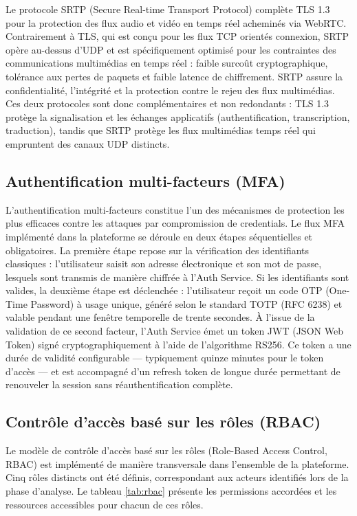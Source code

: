 Le protocole SRTP (Secure Real-time Transport Protocol) complète TLS 1.3 pour la protection des flux audio et vidéo en temps réel acheminés via WebRTC. Contrairement à TLS, qui est conçu pour les flux TCP orientés connexion, SRTP opère au-dessus d'UDP et est spécifiquement optimisé pour les contraintes des communications multimédias en temps réel : faible surcoût cryptographique, tolérance aux pertes de paquets et faible latence de chiffrement. SRTP assure la confidentialité, l'intégrité et la protection contre le rejeu des flux multimédias. Ces deux protocoles sont donc complémentaires et non redondants : TLS 1.3 protège la signalisation et les échanges applicatifs (authentification, transcription, traduction), tandis que SRTP protège les flux multimédias temps réel qui empruntent des canaux UDP distincts.

\subsection{Authentification multi-facteurs (MFA)}
L'authentification multi-facteurs constitue l'un des mécanismes de protection les plus efficaces contre les attaques par compromission de credentials. Le flux MFA implémenté dans la plateforme se déroule en deux étapes séquentielles et obligatoires. La première étape repose sur la vérification des identifiants classiques : l'utilisateur saisit son adresse électronique et son mot de passe, lesquels sont transmis de manière chiffrée à l'Auth Service. Si les identifiants sont valides, la deuxième étape est déclenchée : l'utilisateur reçoit un code OTP (One-Time Password) à usage unique, généré selon le standard TOTP (RFC 6238) et valable pendant une fenêtre temporelle de trente secondes. À l'issue de la validation de ce second facteur, l'Auth Service émet un token JWT (JSON Web Token) signé cryptographiquement à l'aide de l'algorithme RS256. Ce token a une durée de validité configurable — typiquement quinze minutes pour le token d'accès — et est accompagné d'un refresh token de longue durée permettant de renouveler la session sans réauthentification complète.

\subsection{Contrôle d'accès basé sur les rôles (RBAC)}
Le modèle de contrôle d'accès basé sur les rôles (Role-Based Access Control, RBAC) est implémenté de manière transversale dans l'ensemble de la plateforme. Cinq rôles distincts ont été définis, correspondant aux acteurs identifiés lors de la phase d'analyse. Le tableau \ref{tab:rbac} présente les permissions accordées et les ressources accessibles pour chacun de ces rôles.

